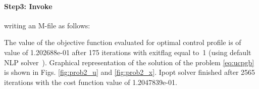 {\small }

\paragraph{Step3: Invoke~} writing an M-file
 as follows: 

{\small }

The value of the objective function evaluated for optimal control
profile is of value of 1.202688e-01 after 175 iterations with exitflag
equal to~1 (using default NLP solver~). Graphical
representation of the solution of the problem \eqref{eq:ucpgb} is
shown in Figs. \ref{fig:prob2_u} and \ref{fig:prob2_x}. Ipopt solver
finished after 2565 iterations with the cost function value of
1.2047839e-01. 

